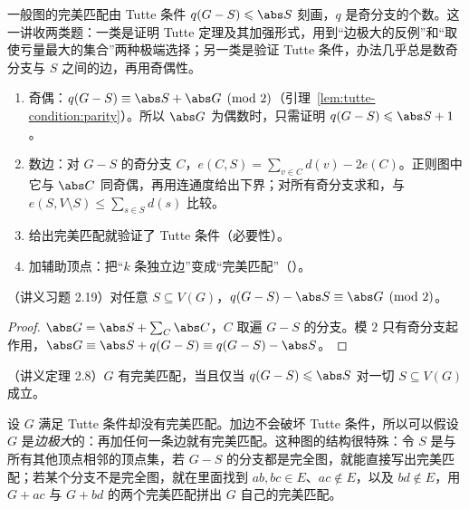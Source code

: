 \label{lec:tutte-condition}

一般图的完美匹配由 Tutte 条件 $q(G-S)\leqslant\abs S$ 刻画，$q$ 是奇分支的个数。这一讲收两类题：一类是证明 Tutte 定理及其加强形式，用到“边极大的反例”和“取使亏量最大的集合”两种极端选择；另一类是验证 Tutte 条件，办法几乎总是数奇分支与 $S$ 之间的边，再用奇偶性。


\begin{enumerate}
\item 奇偶：$q(G-S)\equiv\abs S+\abs G\pmod2$（引理~\ref{lem:tutte-condition:parity}）。所以 $\abs G$ 为偶数时，只需证明 $q(G-S)\leqslant\abs S+1$。
\item 数边：对 $G-S$ 的奇分支 $C$，$e(C,S)=\sum_{v\in C}d(v)-2e(C)$。正则图中它与 $\abs C$ 同奇偶，再用连通度给出下界；对所有奇分支求和，与 $e(S,V\setminus S)\leqslant\sum_{s\in S}d(s)$ 比较。
\item 给出完美匹配就验证了 Tutte 条件（必要性）。
\item 加辅助顶点：把“$k$ 条独立边”变成“完美匹配”（）。
\end{enumerate}

\begin{lemma}\label{lem:tutte-condition:parity}
（讲义习题 2.19）对任意 $S\subseteq V(G)$，$q(G-S)-\abs S\equiv\abs G\pmod2$。
\end{lemma}
\begin{proof}
$\abs G=\abs S+\sum_C\abs C$，$C$ 取遍 $G-S$ 的分支。模 $2$ 只有奇分支起作用，$\abs G\equiv\abs S+q(G-S)\equiv q(G-S)-\abs S$。
\end{proof}

\begin{theorem}[Tutte]\label{thm:tutte-condition:tutte}
（讲义定理 2.8）$G$ 有完美匹配，当且仅当 $q(G-S)\leqslant\abs S$ 对一切 $S\subseteq V(G)$ 成立。
\end{theorem}

\begin{remark}[证明思路]
设 $G$ 满足 Tutte 条件却没有完美匹配。加边不会破坏 Tutte 条件，所以可以假设 $G$ 是\emph{边极大}的：再加任何一条边就有完美匹配。这种图的结构很特殊：令 $S$ 是与所有其他顶点相邻的顶点集，若 $G-S$ 的分支都是完全图，就能直接写出完美匹配；若某个分支不是完全图，就在里面找到 $ab,bc\in E$、$ac\notin E$，以及 $bd\notin E$，用 $G+ac$ 与 $G+bd$ 的两个完美匹配拼出 $G$ 自己的完美匹配。
\end{remark}

